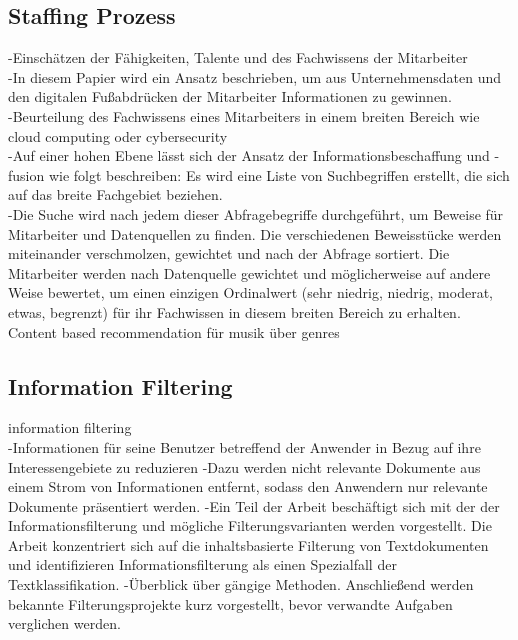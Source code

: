 \subsection{Staffing Prozess}

-Einschätzen der Fähigkeiten, Talente und des Fachwissens der Mitarbeiter\\
-In diesem Papier wird ein Ansatz beschrieben, um aus Unternehmensdaten und den digitalen Fußabdrücken der Mitarbeiter Informationen zu gewinnen.\\
-Beurteilung des Fachwissens eines Mitarbeiters in einem breiten Bereich wie cloud computing oder cybersecurity\\
-Auf einer hohen Ebene lässt sich der Ansatz der Informationsbeschaffung und -fusion wie folgt beschreiben: Es wird eine Liste von Suchbegriffen erstellt, die sich auf das breite Fachgebiet beziehen.\\
-Die Suche wird nach jedem dieser Abfragebegriffe durchgeführt, um Beweise für Mitarbeiter und Datenquellen zu finden. Die verschiedenen Beweisstücke werden miteinander verschmolzen, gewichtet und nach der Abfrage sortiert. Die Mitarbeiter werden nach Datenquelle gewichtet und möglicherweise auf andere Weise bewertet, um einen einzigen Ordinalwert (sehr niedrig, niedrig, moderat, etwas, begrenzt) für ihr Fachwissen in diesem breiten Bereich zu erhalten.\cite{horesh2016information} \\

Content based recommendation für musik über genres \cite{reddy2019content}\\

\subsection{Information Filtering}

information filtering\\
-Informationen für seine Benutzer betreffend der Anwender in Bezug auf ihre Interessengebiete zu reduzieren
-Dazu werden nicht relevante Dokumente aus einem Strom von Informationen entfernt, sodass den Anwendern nur relevante Dokumente präsentiert werden.
-Ein Teil der Arbeit beschäftigt sich mit der der Informationsfilterung und mögliche Filterungsvarianten werden vorgestellt. Die Arbeit konzentriert sich auf die inhaltsbasierte Filterung von Textdokumenten und identifizieren Informationsfilterung als einen Spezialfall der Textklassifikation.
-Überblick über gängige Methoden. Anschließend werden bekannte Filterungsprojekte kurz vorgestellt, bevor verwandte Aufgaben verglichen werden.
\cite{lanquillon2001enhancing}

